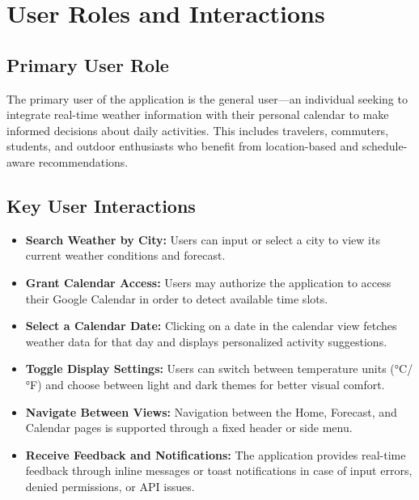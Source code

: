 \documentclass[fontsize=13pt,a4paper]{scrartcl}
\begin{document}
\newpage


\section{User Roles and Interactions}

\subsection{Primary User Role}
The primary user of the application is the general user—an individual seeking to integrate real-time weather information with their personal calendar to make informed decisions about daily activities. This includes travelers, commuters, students, and outdoor enthusiasts who benefit from location-based and schedule-aware recommendations.

\subsection{Key User Interactions}
\begin{itemize}[nosep]
  \item \textbf{Search Weather by City:} Users can input or select a city to view its current weather conditions and forecast.
  \item \textbf{Grant Calendar Access:} Users may authorize the application to access their Google Calendar in order to detect available time slots.
  \item \textbf{Select a Calendar Date:} Clicking on a date in the calendar view fetches weather data for that day and displays personalized activity suggestions.
  \item \textbf{Toggle Display Settings:} Users can switch between temperature units (°C/°F) and choose between light and dark themes for better visual comfort.
  \item \textbf{Navigate Between Views:} Navigation between the Home, Forecast, and Calendar pages is supported through a fixed header or side menu.
  \item \textbf{Receive Feedback and Notifications:} The application provides real-time feedback through inline messages or toast notifications in case of input errors, denied permissions, or API issues.
\end{itemize}
\end{document}
